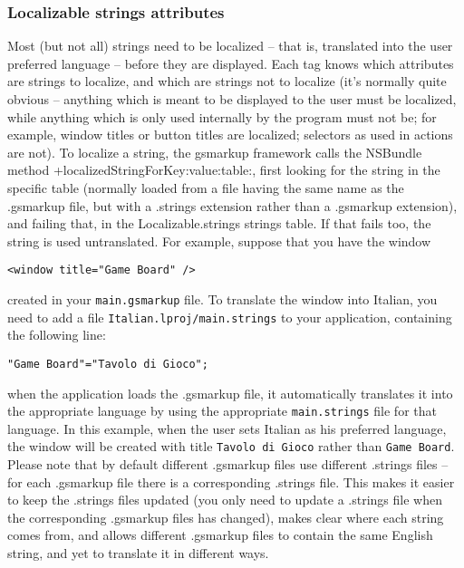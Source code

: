\subsubsection{Localizable strings attributes}
Most (but not all) strings need to be localized -- that is, translated
into the user preferred language -- before they are displayed.  Each
tag knows which attributes are strings to localize, and which are
strings not to localize (it's normally quite obvious -- anything which
is meant to be displayed to the user must be localized, while anything
which is only used internally by the program must not be; for example,
window titles or button titles are localized; selectors as used in
actions are not).  To localize a string, the gsmarkup framework calls the
NSBundle method +localizedStringForKey:value:table:, first looking for
the string in the specific table (normally loaded from a file having
the same name as the .gsmarkup file, but with a .strings extension rather
than a .gsmarkup extension), and failing that, in the Localizable.strings
strings table.  If that fails too, the string is used untranslated.
For example, suppose that you have the window
\begin{verbatim}
<window title="Game Board" />
\end{verbatim}
created in your \texttt{main.gsmarkup} file.  To translate the window
into Italian, you need to add a file
\texttt{Italian.lproj/main.strings} to your application, containing
the following line:
\begin{verbatim}
"Game Board"="Tavolo di Gioco";
\end{verbatim}
when the application loads the .gsmarkup file, it automatically translates
it into the appropriate language by using the appropriate
\texttt{main.strings} file for that language.  In this example, when the
user sets Italian as his preferred language, the window will be
created with title \texttt{Tavolo di Gioco} rather than \texttt{Game
Board}.  Please note that by default different .gsmarkup files use
different .strings files -- for each .gsmarkup file there is a
corresponding .strings file.  This makes it easier to keep the
.strings files updated (you only need to update a .strings file when
the corresponding .gsmarkup files has changed), makes clear where each
string comes from, and allows different .gsmarkup files to contain the
same English string, and yet to translate it in different ways.

